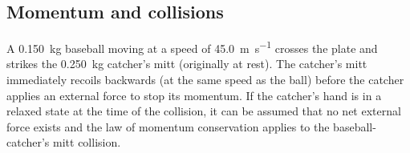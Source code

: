 \documentclass[hw,addpoints,noanswers]{exam}
\begin{document}
\begin{questions}

\clearpage
\section*{Momentum and collisions}
\question
A \SI{0.150}{\kilo\gram} baseball moving at a speed of \SI{45.0}{\meter\per\second} crosses the plate and strikes the \SI{0.250}{\kilo\gram} catcher's mitt (originally at rest). The catcher's mitt immediately recoils backwards (at the same speed as the ball) before the catcher applies an external force to stop its momentum. If the catcher's hand is in a relaxed state at the time of the collision, it can be assumed that no net external force exists and the law of momentum conservation applies to the baseball-catcher's mitt collision. 
\end{questions}
\end{document}
